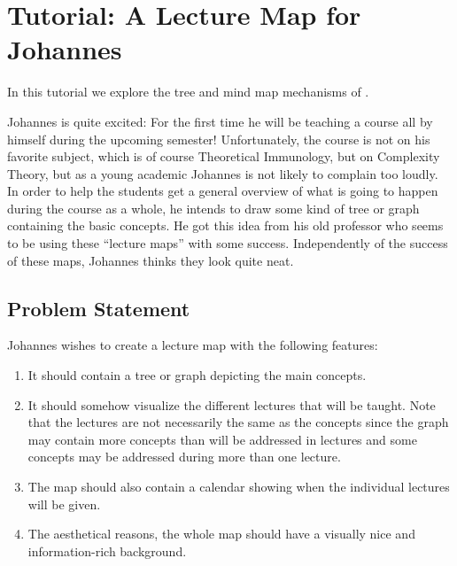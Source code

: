 %
%
%


\section[tutorial-map]{Tutorial: A Lecture Map for Johannes}

In this tutorial we explore the tree and mind map mechanisms of \tikzname.

Johannes is quite excited: For the first time he will be teaching a course all
by himself during the upcoming semester! Unfortunately, the course is not on
his favorite subject, which is of course Theoretical Immunology, but on
Complexity Theory, but as a young academic Johannes is not likely to complain
too loudly. In order to help the students get a general overview of what is
going to happen during the course as a whole, he intends to draw some kind of
tree or graph containing the basic concepts. He got this idea from his old
professor who seems to be using these ``lecture maps'' with some success.
Independently of the success of these maps, Johannes thinks they look quite
neat.


\subsection{Problem Statement}

Johannes wishes to create a lecture map with the following features:
%
\begin{enumerate}
    \item It should contain a tree or graph depicting the main concepts.
    \item It should somehow visualize the different lectures that will be
        taught. Note that the lectures are not necessarily the same as the
        concepts since the graph may contain more concepts than will be
        addressed in lectures and some concepts may be addressed during more
        than one lecture.
    \item The map should also contain a calendar showing when the individual
        lectures will be given.
    \item The aesthetical reasons, the whole map should have a visually nice
        and information-rich background.
\end{enumerate}

